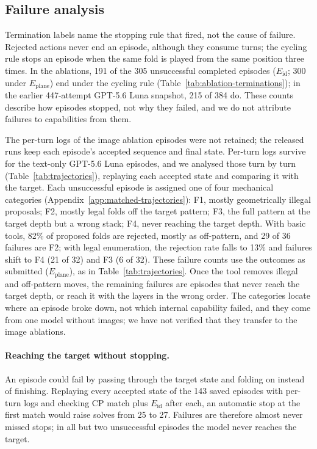 \subsection{Failure analysis}
\label{sec:results-failures}

Termination labels name the stopping rule that fired, not the cause of failure. Rejected
actions never end an episode, although they consume turns; the cycling rule stops an episode
when the same fold is played from the same position three times. In the ablations, 191 of the 305
unsuccessful completed episodes ($E_{\mathrm{id}}$; 300 under $E_{\mathrm{plane}}$) end under the cycling rule (Table~\ref{tab:ablation-terminations}); in the
earlier 447-attempt GPT-5.6 Luna snapshot, 215 of 384 do. These counts describe how episodes
stopped, not why they failed, and we do not attribute failures to capabilities from them.

The per-turn logs of the image ablation episodes were not retained; the released runs keep each
episode's accepted sequence and final state. Per-turn logs survive for the text-only GPT-5.6 Luna
episodes, and we analysed those turn by turn (Table~\ref{tab:trajectories}), replaying each
accepted state and comparing it with the target. Each unsuccessful episode is assigned one of four
mechanical categories (Appendix~\ref{app:matched-trajectories}): F1, mostly geometrically illegal
proposals; F2, mostly legal folds off the target pattern; F3, the full pattern at the target depth
but a wrong stack; F4, never reaching the target depth. With basic tools, 82\% of proposed folds
are rejected, mostly as off-pattern, and 29 of 36 failures are F2; with legal enumeration, the
rejection rate falls to 13\% and failures shift to F4 (21 of 32) and F3 (6 of 32). These failure
counts use the outcomes as submitted ($E_{\mathrm{plane}}$), as in Table~\ref{tab:trajectories}. Once the tool
removes illegal and off-pattern moves, the remaining failures are episodes that never reach the
target depth, or reach it with the layers in the wrong order. The categories locate where an
episode broke down, not which internal capability failed, and they come from one model without
images; we have not verified that they transfer to the image ablations.

\paragraph{Reaching the target without stopping.} An episode could fail by passing through the
target state and folding on instead of finishing. Replaying every accepted state of the 143 saved
episodes with per-turn logs and checking CP match plus $E_{\mathrm{id}}$ after each, an automatic
stop at the first match would raise solves from 25 to 27. Failures are therefore almost never
missed stops; in all but two unsuccessful episodes the model never reaches the target.

